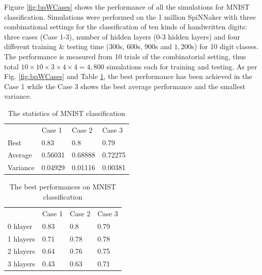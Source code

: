 \documentclass[sigconf]{acmart}
\begin{document}
Figure \ref{fig:bpWCases} shows the performance of all the simulations for MNIST classification.
Simulations were performed on the 1 million SpiNNaker \cite{brown2018spinnaker} with three combinational settings for the classification of ten kinds of handwritten digits: three cases (Case 1-3), number of hidden layers (0-3 hidden layers) and four different training \& testing time ($300$s, $600$s, $900$s and $1,200$s) for 10 digit classes. 
The performance is measured from 10 trials of the combinatorial setting, thus total $10 \times 10 \times 3 \times 4 \times 4 = 4,800$ simulations each for training and testing. 
As per Fig. \ref{fig:bpWCases} and Table \ref{tab:sim_stat}, the best performance has been achieved in the Case 1 while the Case 3 shows the best average performance and the smallest variance. 
\setlength{\tabcolsep}{4pt}
\begin{table}
\setlength{\tabcolsep}{12pt} %
\begin{center}
\caption{The statistics of MNIST classification}
\label{tab:sim_stat}
\begin{tabular}{ llll }
\hline\noalign{\smallskip}
     ~          & Case 1    & Case 2    & Case 3    \\ 
\noalign{\smallskip}
\hline
\noalign{\smallskip}    
    Best 	    & 0.83	    & 0.8 	    & 0.79      \\ %
    Average 	& 0.56031	& 0.68888 	& 0.72275   \\ %
    Variance 	& 0.04929	& 0.01116	& 0.00381   \\ %
\hline
\end{tabular}
\end{center}
\end{table}
\setlength{\tabcolsep}{1.4pt}


\setlength{\tabcolsep}{4pt}
\begin{table}
\setlength{\tabcolsep}{12pt} %
\begin{center}
\caption{The best performances on MNIST classification}
\label{tab:sim_best}
\begin{tabular}{ llll }
\hline\noalign{\smallskip}
     ~          & Case 1    & Case 2    & Case 3    \\ 
\noalign{\smallskip}
\hline
\noalign{\smallskip}    
    0 hlayer 	& 0.83	    & 0.8	    & 0.79   \\
    1 hlayers 	& 0.71  	& 0.78   	& 0.78   \\
    2 hlayers	& 0.64  	& 0.76  	& 0.75   \\
    3 hlayers 	& 0.43  	& 0.63  	& 0.71   \\
\hline
\end{tabular}
\end{center}
\end{table}
\setlength{\tabcolsep}{1.4pt}
\end{document}
